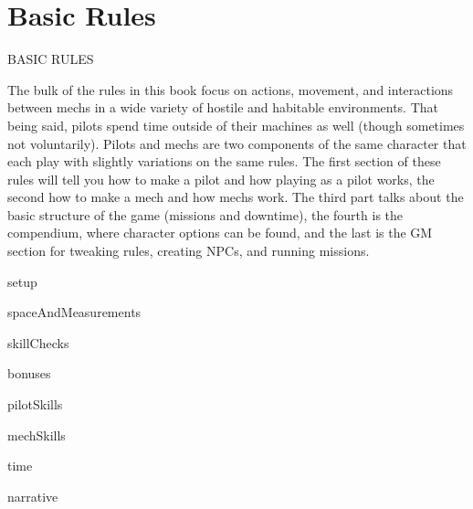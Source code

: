 \part{Basic Rules}
                                     BASIC RULES

The bulk of the rules in this book focus on actions, movement, and interactions between mechs
in a wide variety of hostile and habitable environments. That being said, pilots spend time
outside of their machines as well (though sometimes not voluntarily). Pilots and mechs are two
components of the same character that each play with slightly variations on the same rules.
The first section of these rules will tell you how to make a pilot and how playing as a pilot works,
the second how to make a mech and how mechs work. The third part talks about the basic
structure of the game (missions and downtime), the fourth is the compendium, where character
options can be found, and the last is the GM section for tweaking rules, creating NPCs, and
running missions.

{setup}

{spaceAndMeasurements}

{skillChecks}

{bonuses}

{pilotSkills}

{mechSkills}

{time}

{narrative}


